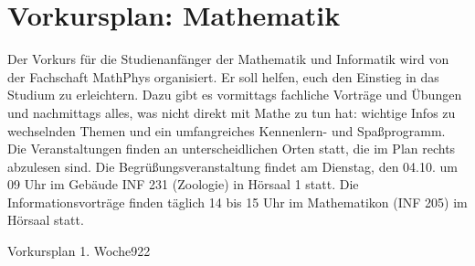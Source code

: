 \section{Vorkursplan: Mathematik}
\label{vkmathe}
Der Vorkurs für die Studienanfänger der Mathematik und Informatik wird von der
Fachschaft MathPhys organisiert. Er soll helfen, euch den Einstieg in das
Studium zu erleichtern. Dazu gibt es vormittags fachliche Vorträge und Übungen
und nachmittags alles, was nicht direkt mit Mathe zu tun hat: wichtige Infos zu
wechselnden Themen und ein umfangreiches Kennenlern- und Spaßprogramm. Die
Veranstaltungen finden an unterscheidlichen Orten statt, die im Plan rechts
abzulesen sind. Die Begrüßungsveranstaltung findet am Dienstag, den 04.10. um 09
Uhr im Gebäude \gls{INF} 231 (Zoologie) in Hörsaal 1 statt. Die
Informationsvorträge finden täglich 14 bis 15 Uhr im Mathematikon
(\gls{INF} 205) im Hörsaal statt. \clearpage



\begin{stundenplan}{Vorkursplan 1. Woche}{9}{22}






\end{stundenplan}

